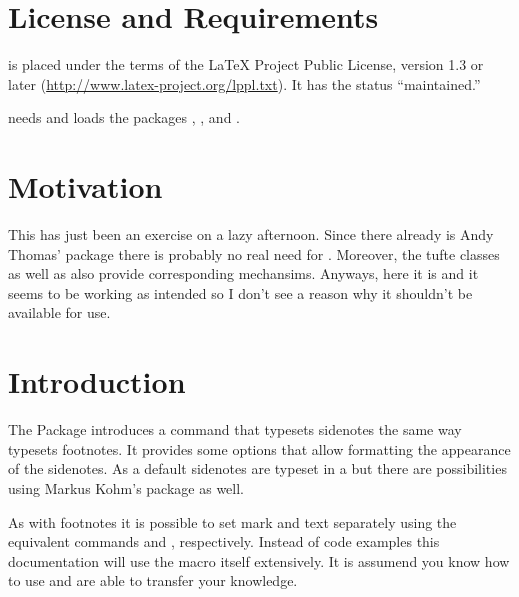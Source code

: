 \documentclass[toc=index,toc=bib,mpinclude]{cnpkgdoc}
\makeatletter
\newcommand*\defaultsidenotes{%
  \setsidenotes{
    note-mark-format = \@textsuperscript{\normalfont##1},
    text-format      = \footnotesize
  }}
\makeatother
\begin{document}
\section{License and Requirements}\label{sec:license}
\snotez is placed under the terms of the \LaTeX{} Project Public License,
version 1.3 or later (\url{http://www.latex-project.org/lppl.txt}). It has the
status ``maintained.''

\snotez needs and loads the packages
,
,
 and
.

\section{Motivation}
This has just been an exercise on a lazy
afternoon.
Since there already is Andy Thomas' 
package there is probably
no real need for \snotez. Moreover, the tufte classes
as well as  also provide corresponding
mechansims. Anyways, here it is and it seems to be working as intended so I
don't see a reason why it shouldn't be available for use.

\section{Introduction}
The \snotez Package introduces a  command%
\begingroup\defaultsidenotes
{}
\endgroup
that typesets sidenotes the
same way  typesets footnotes. It provides some options that allow
formatting the appearance of the sidenotes. As a default sidenotes are typeset in a  but
there are possibilities using Markus Kohm's  package as well.

As with footnotes it is possible to set mark and text separately using the
equivalent commands  and , respectively.
Instead of code examples this documentation will use the  macro
itself extensively. It is assumend you know how to use  and are
able to transfer your knowledge.
\end{document}
